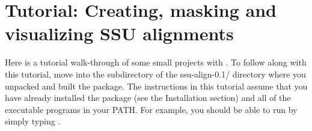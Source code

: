\section{Tutorial: Creating, masking and visualizing SSU alignments}
\label{sec:tutorial}

Here is a tutorial walk-through of some small projects with
. To follow along with this tutorial, move into the
 subdirectory of the {ssu-align-0.1/} directory where
you unpacked and built the package.
The instructions in this tutorial assume that you have already
installed the package (see the Installation section)
and all of the  executable programs
in your PATH. For example, you should be able to run
 by simply typing .

\begin{comment}
\subsection{Files used in this tutorial}

In the first section of this tutorial we'll use the following files in
the \prog{tutorial} directory:

  \begin{sreitems}{}
  \item[\prog{seed-15.fa}] a sequence file containing
    fifteen SSU rRNA sequences, created specifically for use in this
    tutorial. These are full or partial sequences from the archaeal,
    bacterial and eukaryotic default \sft{crw} seed alignments used to
    build the default \software{ssu-align} models.
  \end{sreitems}
\end{comment}






\newpage







%
%
